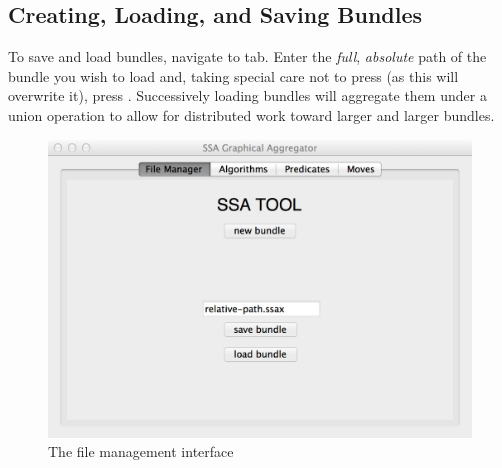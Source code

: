 \subsection{Creating, Loading, and Saving Bundles}
\label{sec:iface:saving}

To save and load bundles, navigate to  tab.
Enter the \emph{full}, \emph{absolute} path of the bundle you wish to load and,
  taking special care not to press 
  (as this will overwrite it),
  press .
Successively loading bundles will aggregate them under a union operation
  to allow for distributed work toward larger and larger bundles.

\begin{figure}
  \centering
  \includegraphics[width=\textwidth]{figs/3}
  \caption{The file management interface}
  \label{fig:iface:fmgr}
\end{figure}

